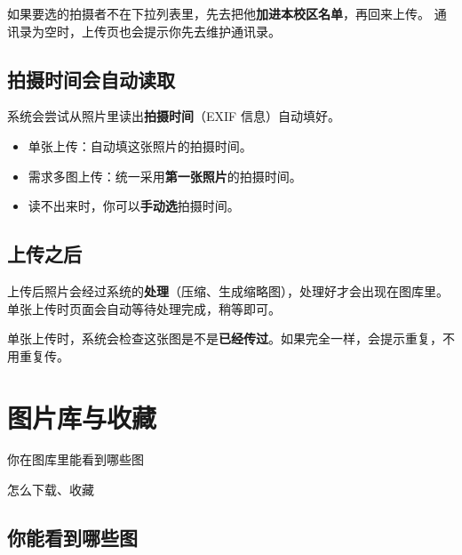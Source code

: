 \documentclass[cn,11pt,green]{elegantbook}
\begin{document}
\begin{warnbox}[人不在名单里怎么办]
  如果要选的拍摄者不在下拉列表里，先去把他\textbf{加进本校区名单}，再回来上传。
  通讯录为空时，上传页也会提示你先去维护通讯录。
\end{warnbox}

\section{拍摄时间会自动读取}

系统会尝试从照片里读出\textbf{拍摄时间}（EXIF 信息）自动填好。

\begin{itemize}
  \item 单张上传：自动填这张照片的拍摄时间。
  \item 需求多图上传：统一采用\textbf{第一张照片}的拍摄时间。
  \item 读不出来时，你可以\textbf{手动选}拍摄时间。
\end{itemize}

\section{上传之后}

上传后照片会经过系统的\textbf{处理}（压缩、生成缩略图），处理好才会出现在图库里。单张上传时页面会自动等待处理完成，稍等即可。

\begin{tipbox}[重复的图传不上去]
  单张上传时，系统会检查这张图是不是\textbf{已经传过}。如果完全一样，会提示重复，不用重复传。
\end{tipbox}

\chapter{图片库与收藏}

\begin{introduction}
  \item 你在图库里能看到哪些图
  \item 怎么下载、收藏
\end{introduction}

\section{你能看到哪些图}
\end{document}
